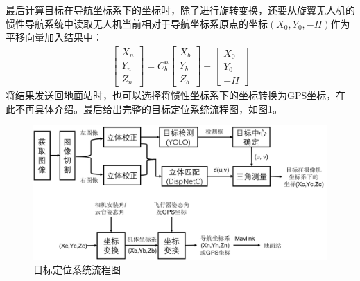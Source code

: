 最后计算目标在导航坐标系下的坐标时，除了进行旋转变换，还要从旋翼无人机的惯性导航系统中读取无人机当前相对于导航坐标系原点的坐标$(X_0, Y_0, -H)$作为平移向量加入结果中：
%
\begin{eqnarray}
\begin{bmatrix}
X_n \\ Y_n \\ Z_n
\end{bmatrix}
= C_b^n
\begin{bmatrix}
X_b \\ Y_b \\ Z_b
\end{bmatrix}
+
\begin{bmatrix}
X_0 \\ Y_0 \\ -H
\end{bmatrix}
\end{eqnarray}
将结果发送回地面站时，也可以选择将惯性坐标系下的坐标转换为GPS坐标，在此不再具体介绍。最后给出完整的目标定位系统流程图，如图\ref{fig:5_2_目标定位系统流程图}。
\begin{figure}[htb] %
	\centering
	\includegraphics[width=6in]{figures/5_2_目标定位系统流程图}
	\caption{目标定位系统流程图}\label{fig:5_2_目标定位系统流程图}
\end{figure}

\newpage
